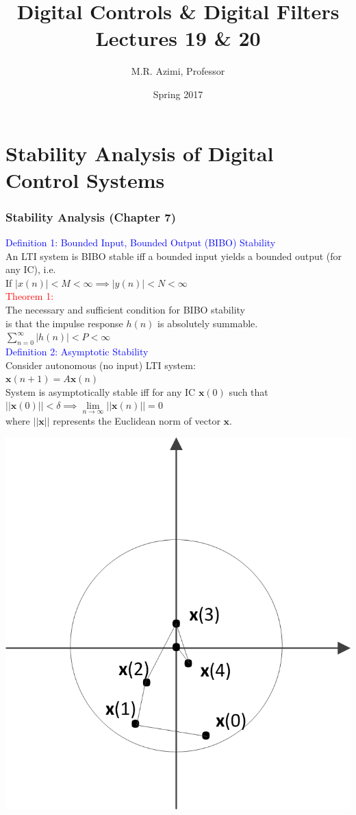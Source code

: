 \documentclass[mathserif, 10pt]{beamer} %
\title[Digital Control \& Digital Filters]{Digital Controls \& Digital Filters \\ Lectures 19 \& 20}
\author[M.R. Azimi]{M.R. Azimi, Professor}
\institute[CSU-ECE]{Department of Electrical and Computer Engineering \\ Colorado State University}
\date{Spring 2017}
\def\x{\mathbf{x}}
\begin{document}

\frame{\titlepage}




\section{Stability Analysis of Digital Control Systems}
\frame
{
\normalsize
\frametitle{Stability Analysis (Chapter 7)}
\vspace{-.5in}
\textcolor{blue}{Definition 1: Bounded Input, Bounded Output (BIBO) Stability}\\
An LTI system is BIBO stable iff a bounded input yields a bounded output (for any IC), i.e. \\ \vspace{0.07in}
If $|x(n)|<M<\infty \implies|y(n)|<N<\infty$\\ \vspace{0.1in}
\textcolor{red}{Theorem 1:}\\
The necessary and sufficient condition for BIBO stability \\
is that the impulse response $h(n)$ is absolutely summable. \\ \vspace{0.07in}
$\sum\limits_{n=0}^{\infty} |h(n)| <P<\infty$\\ \vspace{0.1in}
\textcolor{blue}{Definition 2: Asymptotic Stability}\\
Consider autonomous (no input) LTI system:\\
$\x(n+1) = A\x(n)$\\
System is asymptotically stable iff for any IC $\x(0)$ such that \\  \vspace{0.07in}
$||\x(0)||<\delta \implies \lim\limits_{n\to\infty} ||\x(n)|| = 0$ \\ \vspace{0.05in}
where $||\x||$ represents the Euclidean norm of vector $\x$.

\vspace{-2in}
\hspace{3.25in}
\includegraphics[width=.275\linewidth]{./Figures/assy_stable.png}
}
\end{document}
